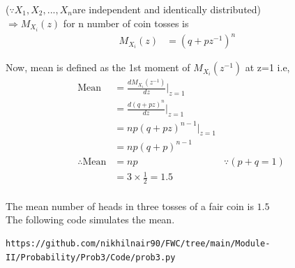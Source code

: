 \documentclass[journal,12pt,twocolumn]{IEEEtran}
\begin{document}
($\because X_1,X_2,...,X_n$are independent and identically distributed)
\\

$\Rightarrow M_{X_i}(z)$ for n number of coin tosses is
\begin{align}
 M_{X_i}(z)&= (q + pz^{-1})^n&
\end{align}

Now, mean is defined as the 1st moment of $M_{X_i}(z^{-1})$ at z=1 i.e,
\begin{align}
\text{Mean}&= \frac{dM_{X_i}(z^{-1})}{dz}|_{z=1}&
\\
&= \frac{d(q + pz)^n}{dz}|_{z=1}&
\\
&=np(q + pz)^{n-1}|_{z=1}&
\\
&= np(q + p)^{n-1}&
\\
\therefore \text{Mean} &= np& {}\because(p+q=1)
\\
&= 3\times\frac{1}{2}= 1.5&
\end{align}
\\

The mean number of heads in three tosses of a fair coin is $1.5$
\\

The following code simulates the mean.

\begin{lstlisting}
https://github.com/nikhilnair90/FWC/tree/main/Module-II/Probability/Prob3/Code/prob3.py
\end{lstlisting}
\end{document}
